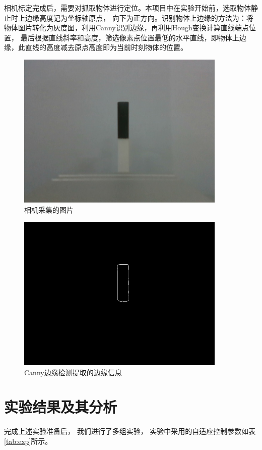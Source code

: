 相机标定完成后，需要对抓取物体进行定位。本项目中在实验开始前，选取物体静止时上边缘高度记为坐标轴原点，
向下为正方向。识别物体上边缘的方法为：将物体图片转化为灰度图，利用Canny识别边缘，再利用Hough变换计算直线端点位置，
最后根据直线斜率和高度，筛选像素点位置最低的水平直线，即物体上边缘，此直线的高度减去原点高度即为当前时刻物体的位置。

\begin{figure}[!ht]
  \centering
  \includegraphics[width=10cm]{chapter04/pic/src}
  \caption{\label{fig:src}
    相机采集的图片}
  \vspace{-0.3cm}
\end{figure}

\begin{figure}[!ht]
  \centering
  \includegraphics[width=10cm]{chapter04/pic/canny}
  \caption{\label{fig:canny}
    Canny边缘检测提取的边缘信息}
  \vspace{-0.3cm}
\end{figure}

\section{实验结果及其分析}
完成上述实验准备后， 我们进行了多组实验，
实验中采用的自适应控制参数如表\ref{tab:exp}所示。

